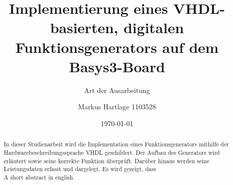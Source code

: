 \documentclass[BCOR=1cm, twoside, ngerman]{scrreprt}
\title{Implementierung eines VHDL-basierten, digitalen Funktionsgenerators auf dem Basys3-Board}
\subtitle{Art der Ausarbeitung}
\author{Markus Hartlage 1103528}
\date{\today} %
\begin{document}
\maketitle

\begin{abstract}
  In dieser Studienarbeit wird die Implementation eines Funktionsgenerators mithilfe der Hardwarebeschreibungssprache VHDL geschildert.
  Der Aufbau des Generators wird erläutert sowie seine korrekte Funktion überprüft.
  Darüber hinaus werden seine Leistungsdaten erfasst und dargelegt.
  Es wird gezeigt, dass \\

A short abstract in english.
\end{abstract}

\tableofcontents
\printbibliography[heading=bibintoc, title={Literaturverzeichnis}]





\end{document}
